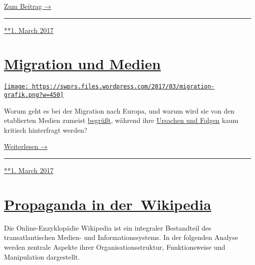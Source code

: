 \href{https://swprs.org/bericht-eines-journalisten/}{Zum Beitrag →}

\begin{center}\rule{0.5\linewidth}{\linethickness}\end{center}

\href{https://swprs.org/2017/03/01/bericht-eines-journalisten/}{**1.
March 2017}

\hypertarget{migration-und-medien}{%
\section{\texorpdfstring{\href{https://swprs.org/2017/03/01/migration-und-medien/}{Migration
und Medien}}{Migration und Medien}}\label{migration-und-medien}}

\href{https://swprs.org/2017/03/01/migration-und-medien/}{\texttt{[image: https://swprs.files.wordpress.com/2017/03/migration-grafik.png?w=450]}}

Worum geht es bei der Migration nach Europa, und warum wird sie von den
etablierten Medien zumeist
\href{https://www.otto-brenner-stiftung.de/wissenschaftsportal/informationsseiten-zu-studien/studien-2017/die-fluechtlingskrise-in-den-medien/}{begrüßt},
während ihre
\href{https://www.heise.de/tp/features/Massenwanderungen-haben-sowohl-in-den-Herkunftslaendern-als-auch-den-Ziellaendern-der-Migranten-4205760.html?seite=all}{Ursachen
und Folgen} kaum kritisch hinterfragt werden?

\href{https://swprs.org/migration-und-medien/}{Weiterlesen →}

\begin{center}\rule{0.5\linewidth}{\linethickness}\end{center}

\href{https://swprs.org/2017/03/01/migration-und-medien/}{**1. March
2017}

\hypertarget{propaganda-in-der-wikipedia}{%
\section{\texorpdfstring{\href{https://swprs.org/2017/03/01/propaganda-in-der-wikipedia/}{Propaganda
in
der~Wikipedia}}{Propaganda in der~Wikipedia}}\label{propaganda-in-der-wikipedia}}

Die Online-Enzyklopädie Wikipedia ist ein integraler Bestandteil des
transatlantischen Medien- und Informationssystems. In der folgenden
Analyse werden zentrale Aspekte ihrer Organisationsstruktur,
Funktionsweise und Manipulation dargestellt.

